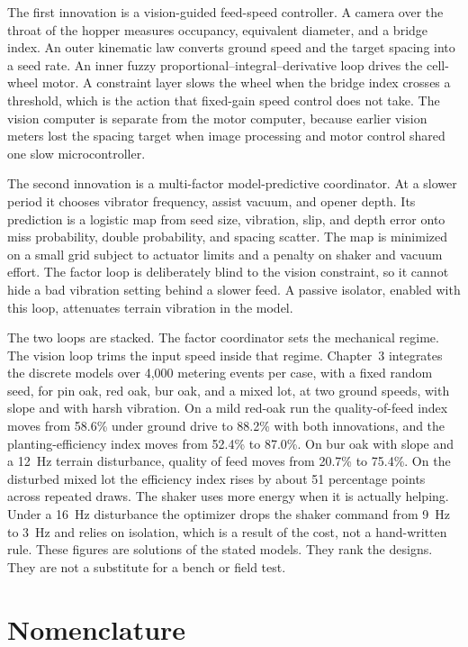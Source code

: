 \documentclass[12pt,a4paper]{report}
\numberwithin{equation}{chapter}
\numberwithin{figure}{chapter}
\numberwithin{table}{chapter}
\begin{document}
The first innovation is a vision-guided feed-speed controller. A camera over the throat of the hopper measures occupancy, equivalent diameter, and a bridge index. An outer kinematic law converts ground speed and the target spacing into a seed rate. An inner fuzzy proportional--integral--derivative loop drives the cell-wheel motor. A constraint layer slows the wheel when the bridge index crosses a threshold, which is the action that fixed-gain speed control does not take. The vision computer is separate from the motor computer, because earlier vision meters lost the spacing target when image processing and motor control shared one slow microcontroller.

The second innovation is a multi-factor model-predictive coordinator. At a slower period it chooses vibrator frequency, assist vacuum, and opener depth. Its prediction is a logistic map from seed size, vibration, slip, and depth error onto miss probability, double probability, and spacing scatter. The map is minimized on a small grid subject to actuator limits and a penalty on shaker and vacuum effort. The factor loop is deliberately blind to the vision constraint, so it cannot hide a bad vibration setting behind a slower feed. A passive isolator, enabled with this loop, attenuates terrain vibration in the model.

The two loops are stacked. The factor coordinator sets the mechanical regime. The vision loop trims the input speed inside that regime. Chapter~3 integrates the discrete models over 4{,}000 metering events per case, with a fixed random seed, for pin oak, red oak, bur oak, and a mixed lot, at two ground speeds, with slope and with harsh vibration. On a mild red-oak run the quality-of-feed index moves from 58.6\% under ground drive to 88.2\% with both innovations, and the planting-efficiency index moves from 52.4\% to 87.0\%. On bur oak with slope and a 12~Hz terrain disturbance, quality of feed moves from 20.7\% to 75.4\%. On the disturbed mixed lot the efficiency index rises by about 51 percentage points across repeated draws. The shaker uses more energy when it is actually helping. Under a 16~Hz disturbance the optimizer drops the shaker command from 9~Hz to 3~Hz and relies on isolation, which is a result of the cost, not a hand-written rule. These figures are solutions of the stated models. They rank the designs. They are not a substitute for a bench or field test.

\tableofcontents
\listoffigures
\listoftables

\chapter*{Nomenclature}
\end{document}
